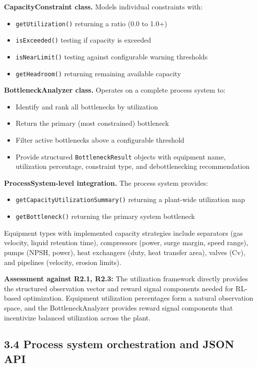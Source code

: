 \documentclass[review,3p]{custom}
\begin{document}
\textbf{CapacityConstraint class.} Models individual constraints with:
\begin{itemize}
  \item \texttt{getUtilization()} returning a ratio (0.0 to 1.0+)
  \item \texttt{isExceeded()} testing if capacity is exceeded
  \item \texttt{isNearLimit()} testing against configurable warning thresholds
  \item \texttt{getHeadroom()} returning remaining available capacity
\end{itemize}

\textbf{BottleneckAnalyzer class.} Operates on a complete process system to:
\begin{itemize}
  \item Identify and rank all bottlenecks by utilization
  \item Return the primary (most constrained) bottleneck
  \item Filter active bottlenecks above a configurable threshold
  \item Provide structured \texttt{BottleneckResult} objects with equipment name, utilization percentage, constraint type, and debottlenecking recommendation
\end{itemize}

\textbf{ProcessSystem-level integration.} The process system provides:
\begin{itemize}
  \item \texttt{getCapacityUtilizationSummary()} returning a plant-wide utilization map
  \item \texttt{getBottleneck()} returning the primary system bottleneck
\end{itemize}

Equipment types with implemented capacity strategies include separators (gas velocity, liquid retention time), compressors (power, surge margin, speed range), pumps (NPSH, power), heat exchangers (duty, heat transfer area), valves (Cv), and pipelines (velocity, erosion limits).

\textbf{Assessment against R2.1, R2.3:} The utilization framework directly provides the structured observation vector and reward signal components needed for RL-based optimization. Equipment utilization percentages form a natural observation space, and the BottleneckAnalyzer provides reward signal components that incentivize balanced utilization across the plant.

\subsection{3.4 Process system orchestration and JSON API}
\end{document}
